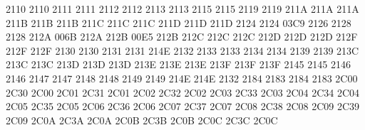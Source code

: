  2110 2110 %
 2111 2111 %
 2112 2112 %
 2113 2113 %
 2115 2115 %
 2119 2119 %
\setcclcucx 211A 211A 211A %
\setcclcucx 211B 211B 211B %
\setcclcucx 211C 211C 211C %
\setcclcucx 211D 211D 211D %
 2124 2124 %
 03C9 2126 %
 2128 2128 %
\setcclcucx 212A 006B 212A %
\setcclcucx 212B 00E5 212B %
\setcclcucx 212C 212C 212C %
\setcclcucx 212D 212D 212D %
\setcclcucx 212F 212F 212F %
 2130 2130 %
 2131 2131 %
 214E 2132 %
 2133 2133 %
 2134 2134 %
 2139 2139 %
\setcclcucx 213C 213C 213C %
\setcclcucx 213D 213D 213D %
\setcclcucx 213E 213E 213E %
\setcclcucx 213F 213F 213F %
 2145 2145 %
 2146 2146 %
 2147 2147 %
 2148 2148 %
 2149 2149 %
\setcclcucx 214E 214E 2132 %
 2184 2183 %
 2184 2183 %
\setcclcucx 2C00 2C30 2C00 %
\setcclcucx 2C01 2C31 2C01 %
\setcclcucx 2C02 2C32 2C02 %
\setcclcucx 2C03 2C33 2C03 %
\setcclcucx 2C04 2C34 2C04 %
\setcclcucx 2C05 2C35 2C05 %
\setcclcucx 2C06 2C36 2C06 %
\setcclcucx 2C07 2C37 2C07 %
\setcclcucx 2C08 2C38 2C08 %
\setcclcucx 2C09 2C39 2C09 %
\setcclcucx 2C0A 2C3A 2C0A %
\setcclcucx 2C0B 2C3B 2C0B %
\setcclcucx 2C0C 2C3C 2C0C %
